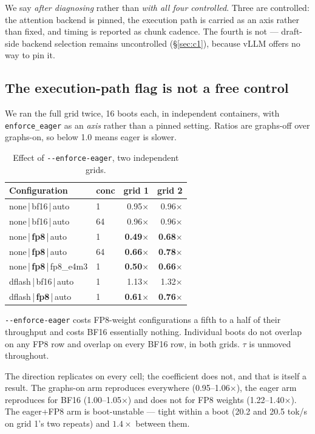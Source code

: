 \documentclass[11pt]{article}
\newcommand{\tw}[1]{\texttt{\small #1}}
\begin{document}
\noindent
We say \emph{after diagnosing} rather than \emph{with all four controlled}.
Three are controlled: the attention backend is pinned, the execution path is
carried as an axis rather than fixed, and timing is reported as chunk
cadence. The fourth is not --- draft-side backend selection remains
uncontrolled (\S\ref{sec:c1}), because vLLM offers no way to pin it.

\subsection{The execution-path flag is not a free control}

We ran the full grid twice, 16 boots each, in independent containers, with
\tw{enforce\_eager} as an \emph{axis} rather than a pinned setting. Ratios
are graphs-off over graphs-on, so below 1.0 means eager is slower.

\begin{table}[h]\centering\small
\caption{Effect of \tw{-{}-enforce-eager}, two independent grids.}
\begin{tabular}{llrr}
\toprule
Configuration & conc & grid 1 & grid 2\\
\midrule
none\,|\,bf16\,|\,auto & 1 & 0.95$\times$ & 0.96$\times$\\
none\,|\,bf16\,|\,auto & 64 & 0.96$\times$ & 0.96$\times$\\
none\,|\,\textbf{fp8}\,|\,auto & 1 & \textbf{0.49$\times$} & \textbf{0.68$\times$}\\
none\,|\,\textbf{fp8}\,|\,auto & 64 & \textbf{0.66$\times$} & \textbf{0.78$\times$}\\
none\,|\,\textbf{fp8}\,|\,fp8\_e4m3 & 1 & \textbf{0.50$\times$} & \textbf{0.66$\times$}\\
dflash\,|\,bf16\,|\,auto & 1 & 1.13$\times$ & 1.32$\times$\\
dflash\,|\,\textbf{fp8}\,|\,auto & 1 & \textbf{0.61$\times$} & \textbf{0.76$\times$}\\
\bottomrule
\end{tabular}
\end{table}

\noindent
\tw{-{}-enforce-eager} costs FP8-weight configurations a fifth to a half of
their throughput and costs BF16 essentially nothing. Individual boots do not
overlap on any FP8 row and overlap on every BF16 row, in both grids. $\tau$
is unmoved throughout.

The direction replicates on every cell; the coefficient does not, and that
is itself a result. The graphs-on arm reproduces everywhere
(0.95--1.06$\times$), the eager arm reproduces for BF16 (1.00--1.05$\times$)
and does not for FP8 weights (1.22--1.40$\times$). The eager+FP8 arm is
boot-unstable --- tight within a boot (20.2 and 20.5 tok/s on grid 1's two
repeats) and $1.4\times$ between them.
\end{document}
